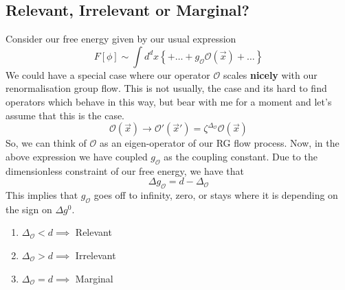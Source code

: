 \documentclass[11pt, oneside]{article}   	%
\begin{document}
\subsection{Relevant, Irrelevant or Marginal?} 
Consider our free energy given by our usual expression 
\[
	F [ \phi ] \sim \int d^ d x \left\{  + \dots + g_{ \mathcal{ O } } \mathcal{ O } ( \vec{x} ) + \dots  \right\}  
\]  We could have a special case 
where our operator $ \mathcal{ O } $ scales \textbf{nicely}
with our renormalisation group flow. This is not usually, 
the case and its hard to find operators which behave in this way, 
but bear with me for a moment and let's assume that this is the case. 
\[
	\mathcal{ O } ( \vec{x} ) \to \mathcal{ O } ' ( \vec{x} ' ) = \zeta^{ \Delta_{ \mathcal{ O } } } \mathcal{ O } ( \vec{x} ) 
\] So, we can 
think of $\mathcal{ O } $ as an eigen-operator 
of our RG flow process. Now, in the above expression 
we have coupled $ g_{ \mathcal{ O } } $ as the coupling constant. 
Due to the dimensionless constraint of our free energy, 
we have that 
\[
 \Delta g_{ \mathcal{ O } } = d - \Delta _{ \mathcal{ O } }
\] This implies that $ g_{ \mathcal{ O } }$ goes 
off to infinity, zero, or stays where it is depending
on the sign on $ \Delta g ^{ \mathcal{ 0 }}$. 

\begin{enumerate}
	\item $ \Delta_{ \mathcal{ O } } < d \implies $ Relevant 
	\item $ \Delta_{ \mathcal{ O } } > d  \implies $ Irrelevant
	\item $ \Delta_{ \mathcal{ O } }  = d \implies $ Marginal 
\end{enumerate}
\end{document}
